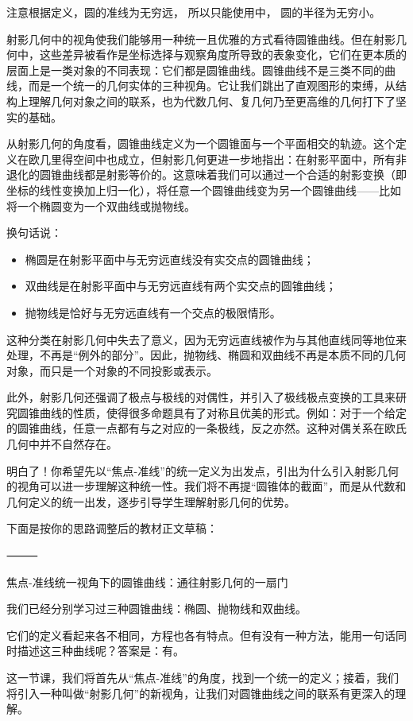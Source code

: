 注意根据定义，圆的准线为无穷远， 所以只能使用中， 圆的半径为无穷小。


射影几何中的视角使我们能够用一种统一且优雅的方式看待圆锥曲线。但在射影几何中，这些差异被看作是坐标选择与观察角度所导致的表象变化，它们在更本质的层面上是一类对象的不同表现：它们都是圆锥曲线。圆锥曲线不是三类不同的曲线，而是一个统一的几何实体的三种视角。它让我们跳出了直观图形的束缚，从结构上理解几何对象之间的联系，也为代数几何、复几何乃至更高维的几何打下了坚实的基础。

从射影几何的角度看，圆锥曲线定义为一个圆锥面与一个平面相交的轨迹。这个定义在欧几里得空间中也成立，但射影几何更进一步地指出：在射影平面中，所有非退化的圆锥曲线都是射影等价的。这意味着我们可以通过一个合适的射影变换（即坐标的线性变换加上归一化），将任意一个圆锥曲线变为另一个圆锥曲线——比如将一个椭圆变为一个双曲线或抛物线。

换句话说：
\begin{itemize}
\item 椭圆是在射影平面中与无穷远直线没有实交点的圆锥曲线；
\item 双曲线是在射影平面中与无穷远直线有两个实交点的圆锥曲线；
\item 抛物线是恰好与无穷远直线有一个交点的极限情形。
\end{itemize}

这种分类在射影几何中失去了意义，因为无穷远直线被作为与其他直线同等地位来处理，不再是“例外的部分”。因此，抛物线、椭圆和双曲线不再是本质不同的几何对象，而只是一个对象的不同投影或表示。

此外，射影几何还强调了极点与极线的对偶性，并引入了极线极点变换的工具来研究圆锥曲线的性质，使得很多命题具有了对称且优美的形式。例如：对于一个给定的圆锥曲线，任意一点都有与之对应的一条极线，反之亦然。这种对偶关系在欧氏几何中并不自然存在。

明白了！你希望先以“焦点-准线”的统一定义为出发点，引出为什么引入射影几何的视角可以进一步理解这种统一性。我们将不再提“圆锥体的截面”，而是从代数和几何定义的统一出发，逐步引导学生理解射影几何的优势。

下面是按你的思路调整后的教材正文草稿：

⸻

焦点-准线统一视角下的圆锥曲线：通往射影几何的一扇门

我们已经分别学习过三种圆锥曲线：椭圆、抛物线和双曲线。

它们的定义看起来各不相同，方程也各有特点。但有没有一种方法，能用一句话同时描述这三种曲线呢？答案是：有。

这一节课，我们将首先从“焦点-准线”的角度，找到一个统一的定义；接着，我们将引入一种叫做“射影几何”的新视角，让我们对圆锥曲线之间的联系有更深入的理解。

